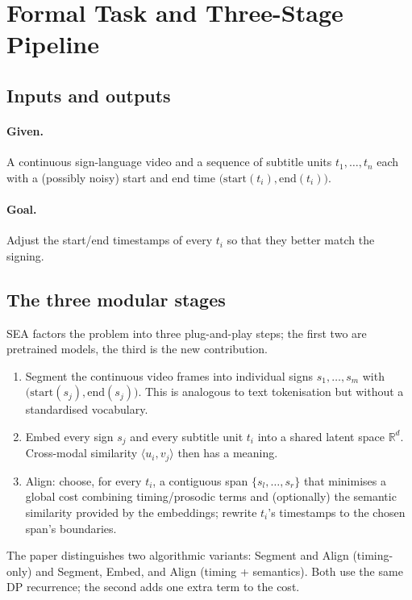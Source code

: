 \documentclass[11pt,a4paper]{article}
\def\textbf#1{#1}%
\def\emph#1{#1}%
\begin{document}
\section{Formal Task and Three-Stage Pipeline}
\label{sec:formal-task}

\subsection{Inputs and outputs}
\paragraph{Given.} A continuous sign-language video and a sequence of subtitle
units $t_1, \ldots, t_n$ each with a (possibly noisy) start and end time
$\bigl(\mathrm{start}(t_i), \mathrm{end}(t_i)\bigr)$.
\paragraph{Goal.} Adjust the start/end timestamps of every $t_i$ so that they
better match the signing.

\subsection{The three modular stages}
SEA factors the problem into three plug-and-play steps; the first two are
pretrained models, the third is the new contribution.
\begin{enumerate}[leftmargin=1.5em]
  \item \textbf{Segment} the continuous video frames into individual signs
        $s_1, \ldots, s_m$ with $\bigl(\mathrm{start}(s_j), \mathrm{end}(s_j)\bigr)$.
        This is analogous to text tokenisation but without a standardised
        vocabulary.
  \item \textbf{Embed} every sign $s_j$ and every subtitle unit $t_i$ into a
        \emph{shared} latent space $\mathbb{R}^d$. Cross-modal similarity
        $\langle u_i, v_j \rangle$ then has a meaning.
  \item \textbf{Align}: choose, for every $t_i$, a \emph{contiguous} span
        $\{s_l, \ldots, s_r\}$ that minimises a global cost combining
        timing/prosodic terms and (optionally) the semantic similarity
        provided by the embeddings; rewrite $t_i$'s timestamps to the chosen
        span's boundaries.
\end{enumerate}

The paper distinguishes two algorithmic variants:
\textbf{Segment and Align} (timing-only) and \textbf{Segment, Embed, and
Align} (timing + semantics). Both use the same DP recurrence; the second adds
one extra term to the cost.
\end{document}
